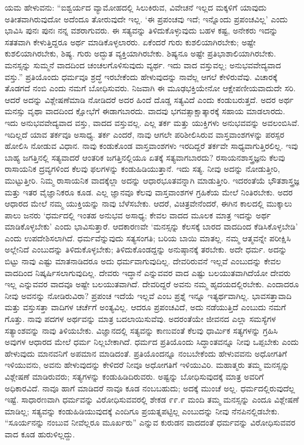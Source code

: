 ಯಮ ಹೇಳುವನು: “ಐಶ್ವರ್ಯದ ವ್ಯಾಮೋಹದಲ್ಲಿ ಸಿಲುಕಿರುವ, ವಿವೇಚನೆ ಇಲ್ಲದ ಮಕ್ಕಳಿಗೆ ಯಾವುದು ಅತೀತವಾಗಿರುವುದೋ ಅದೆಂದೂ ತೋರುವುದೇ ಇಲ್ಲ. ‘ಈ ಪ್ರಪಂಚವು ಇದೆ; ಇನ್ನೊಂದು ಪ್ರಪಂಚವಿಲ್ಲ’ ಎಂದು ಭಾವಿಸಿ ಪುನಃ ಪುನಃ ನನ್ನ ವಶರಾಗುವರು. ಈ ಸತ್ಯವನ್ನು ತಿಳಿದುಕೊಳ್ಳುವುದು ಬಹಳ ಕಷ್ಟ, ಅನೇಕರು ಇದನ್ನು ಸತತವಾಗಿ ಕೇಳುತ್ತಿದ್ದರೂ ಅರ್ಥ ಮಾಡಿಕೊಳ್ಳಲಾರರು. ಏಕೆಂದರೆ ಗುರು ಕುಶಲಿಯಾಗಿರಬೇಕು; ಅಷ್ಟೇ ಕುಶಲಿಯಾಗಿರಬೇಕು, ಶಿಷ್ಯ. ಗುರು ಅದ್ಭುತ ವ್ಯಕ್ತಿಯಾಗಿರಬೇಕು. ಶಿಷ್ಯನೂ ಅಷ್ಟೇ ಪ್ರತಿಭಾಶಾಲಿಯಾಗಿರಬೇಕು. ಮನಸ್ಸನ್ನು ಸುಮ್ಮನೆ ವಾದದಿಂದ ಚಂಚಲಗೊಳಿಸುವುದು ವ್ಯರ್ಥ. ಇದು ವಾದ ವಸ್ತುವಲ್ಲ; ಅನುಭವವೇದ್ಯವಾದ ವಸ್ತು.” ಪ್ರತಿಯೊಂದು ಧರ್ಮವೂ ಶ್ರದ್ಧೆ ಇರಬೇಕೆಂದು ಹೇಳುವುದನ್ನು ನಾವೆಲ್ಲ ಆಗಲೆ ಕೇಳಿರುವೆವು. ವಿಚಾರಕ್ಕೆ ತೊಡಗದೆ ನಂಬಿ ಎಂದು ನಮಗೆ ಬೋಧಿಸುವರು. ನಿಜವಾಗಿ ಈ ಮೂಢಭಕ್ತಿಯೇನೋ ಆಕ್ಷೇಪಣೀಯವಾದುದೇ ಸರಿ. ಆದರೆ ಅದನ್ನು ವಿಶ್ಲೇಷಣೆಮಾಡಿ ನೋಡಿದರೆ ಅದರ ಹಿಂದೆ ದೊಡ್ಡ ಸತ್ಯವಿದೆ ಎಂದು ಕಂಡುಬರುತ್ತದೆ. ಅದರ ಅರ್ಥ ಮನಸ್ಸು ವೃಥಾ ವಾದದಿಂದ ಕ್ಷೋಭೆಗೆ ಈಡಾಗಬಾರದು. ವಾದವು ಭಗವತ್ಸಾಕ್ಷಾತ್ಕಾರಕ್ಕೆ ಸಹಾಯ ಮಾಡಲಾರದು. ಇದು ಅನುಭವವೇದ್ಯವಾದ ವಸ್ತು, ವಾದದ ವಸ್ತುವಲ್ಲ. ಎಲ್ಲ ತರ್ಕ ಮತ್ತು ಯುಕ್ತಿಗಳು ಅನುಭವವನ್ನು ಅವಲಂಬಿಸಿವೆ. ಇದಿಲ್ಲದೆ ಯಾವ ತರ್ಕವೂ ಅಸಾಧ್ಯ. ತರ್ಕ ಎಂದರೆ, ನಾವು ಆಗಲೇ ಪರಿಶೀಲಿಸಿರುವ ವಾಸ್ತವಾಂಶಗಳನ್ನು ಪರಸ್ಪರ ಹೋಲಿಸಿ ನೋಡುವ ವಿಧಾನ. ನಾವು ಕಂಡುಕೊಂಡ ವಾಸ್ತವಾಂಶಗಳು ಇರದಿದ್ದರೆ ತರ್ಕವೇ ಸಾಧ್ಯವಾಗುತ್ತಿರಲಿಲ್ಲ. ಇವು ಬಾಹ್ಯ ಜಗತ್ತಿನಲ್ಲಿ ಸತ್ಯವಾದರೆ ಆಂತರಿಕ ಜಗತ್ತಿನಲ್ಲಿಯೂ ಏತಕ್ಕೆ ಸತ್ಯವಾಗಬಾರದು? ರಸಾಯನಶಾಸ್ತ್ರಜ್ಞನು ಕೆಲವು ರಾಸಾಯನಿಕ ದ್ರವ್ಯಗಳಿಂದ ಕೆಲವು ಫಲಗಳನ್ನು ಕಂಡುಹಿಡಿಯುತ್ತಾನೆ. ಇದು ಸತ್ಯ. ನೀವು ಅದನ್ನು ನೋಡುತ್ತೀರಿ, ಮುಟ್ಟುತ್ತೀರಿ. ನಿಮ್ಮ ರಾಸಾಯನಿಕ ವಾದಕ್ಕೆಲ್ಲಾ ಅದನ್ನು ಆಧಾರಭೂತವನ್ನಾಗಿ ಮಾಡುತ್ತೀರಿ. ಇದರಂತೆಯೆ ಭೌತಶಾಸ್ತ್ರಜ್ಞ ಮತ್ತು ಇತರ ವೈಜ್ಞಾನಿಕರೂ ಕೂಡ. ಎಲ್ಲ ಜ್ಞಾನವೂ ಕೆಲವು ವಾಸ್ತವಾಂಶಗಳ ಗ್ರಹಿಕೆಯ ಮೇಲೆ ನಿಂತಿರಬೇಕು. ಅದರ ಆಧಾರದ ಮೇಲೆ ನಮ್ಮ ಯುಕ್ತಿಯನ್ನು ನಾವು ಬೆಳೆಸಬೇಕು. ಆದರೆ, ವಿಚಿತ್ರವೇನೆಂದರೆ, ಈಗಿನ ಕಾಲದಲ್ಲಿ ಮುಕ್ಕಾಲು ಪಾಲು ಜನರು ‘ಧರ್ಮದಲ್ಲಿ ಇಂತಹ ಅನುಭವ ಅಸಾಧ್ಯ; ಕೇವಲ ವಾದದ ಮೂಲಕ ಮಾತ್ರ ಇದನ್ನು ಅರ್ಥ ಮಾಡಿಕೊಳ್ಳಬೇಕು’ ಎಂದು ಭಾವಿಸುತ್ತಾರೆ. ಆದಕಾರಣವೇ ‘ಮನಸ್ಸನ್ನು ಕೆಲಸಕ್ಕೆ ಬಾರದ ವಾದದಿಂದ ಕೆಡಿಸಿಕೊಳ್ಳಬೇಡಿ’ ಎಂದು ಉಪದೇಶಿಸಲಾಗಿದೆ. ಧರ್ಮವೆನ್ನುವುದು ಸತ್ಯಸಂಗತಿ; ಬರಿಯ ಬಾಯಿ ಮಾತಲ್ಲ. ನಮ್ಮ ಆತ್ಮವನ್ನೇ ಪರೀಕ್ಷಿಸಿ ಅಲ್ಲೇನಿದೆ ಎಂಬುದನ್ನು ತಿಳಿದುಕೊಳ್ಳಬೇಕು; ತಿಳಿದುಕೊಂಡದ್ದನ್ನು ಅನುಷ್ಠಾನಕ್ಕೆ ತರಬೇಕು. ಅದೇ ಧರ್ಮ. ಅದನ್ನು ಬಿಟ್ಟು ನಾವು ಎಷ್ಟು ಮಾತನಾಡಿದರೂ ಅದು ಧರ್ಮವಾಗುವುದಿಲ್ಲ. ದೇವರಿರುವನೆ ಇಲ್ಲವೆ ಎಂಬುದನ್ನು ಕೇವಲ ವಾದದಿಂದ ನಿಷ್ಕರ್ಷಿಸಲಾಗುವುದಿಲ್ಲ. ದೇವರು ಇದ್ಧಾನೆ ಎನ್ನುವವರ ವಾದ ಎಷ್ಟು ಬಲಯುತವಾಗಿದೆಯೋ ದೇವರು ಇಲ್ಲ ಎನ್ನುವವರ ವಾದವೂ ಅಷ್ಟೇ ಬಲಯುತವಾಗಿದೆ. ದೇವರಿದ್ದರೆ ಅವನು ನಮ್ಮ ಹೃದಯದಲ್ಲಿರಬೇಕು. ಎಂದಾದರೂ ನೀವು ಅವನನ್ನು ನೋಡಿರುವಿರಾ? ಪ್ರಪಂಚ ಇದೆಯೆ ಇಲ್ಲವೆ ಎಂಬ ಪ್ರಶ್ನೆ ಇನ್ನೂ ಇತ್ಯರ್ಥವಾಗಿಲ್ಲ. ಭಾವಸತ್ತಾವಾದಿ ಮತ್ತು ವಸ್ತುಸತ್ತಾ ವಾದಿಗಳ ಚರ್ಚೆಗೆ ಅಂತ್ಯವಿಲ್ಲ. ಆದರೂ ಪ್ರಪಂಚವಿದೆ, ಅದು ನಡೆಯುತ್ತಿದೆ ಎಂಬುದು ನಮಗೆ ಗೊತ್ತು. ನಾವು ಪದಗಳ ಅರ್ಥವನ್ನು ಮಾತ್ರ ಬದಲಾಯಿಸುವೆವು. ಅದರಂತೆಯೇ ಜೀವನದ ಎಲ್ಲಾ ಸಮಸ್ಯೆಗಳ ಸತ್ಯಾಂಶವನ್ನು ನಾವು ತಿಳಿಯಬೇಕು. ವಿಜ್ಞಾನದಲ್ಲಿ ಸತ್ಯವನ್ನು ಕಾಣುವಂತೆ ಕೆಲವು ಧಾರ್ಮಿಕ ಸತ್ಯಗಳನ್ನು ಗ್ರಹಿಸಿ ಅವುಗಳ ಆಧಾರದ ಮೇಲೆ ಧರ್ಮ ನಿಲ್ಲಬೇಕಾಗಿದೆ. ಧರ್ಮದ ಪ್ರತಿಯೊಂದು ಸಿದ್ಧಾಂತವನ್ನೂ ನೀವು ಒಪ್ಪಬೇಕು ಎಂದು ಹೇಳುವುದು ಮಾನವನಿಗೆ ಅಪಮಾನ ಮಾಡಿದಂತೆ. ಪ್ರತಿಯೊಂದನ್ನೂ ನಂಬಬೇಕೆಂದು ಹೇಳುವವನು ಅಧೋಗತಿಗೆ ಇಳಿಯುವನು, ಅವನು ಹೇಳುವುದನ್ನು ಕೇಳಿದರೆ ನೀವೂ ಅಧೋಗತಿಗೆ ಇಳಿಯುವಿರಿ. ಮಹಾತ್ಮರು ತಮ್ಮ ಮನಸ್ಸನ್ನು ವಿಶ್ಲೇಷಣೆ ಮಾಡಿರುವರು; ಸತ್ಯಗಳನ್ನು ಕಂಡುಹಿಡಿದಿರುವರು. ಅಷ್ಟನ್ನು ಬೋಧಿಸುವುದಕ್ಕೆ ಮಾತ್ರ ಅವರಿಗೆ ಅಧಿಕಾರವಿದೆ. ನಾವೂ ಹಾಗೆ ಮಾಡಿದರೆ ನಾವೂ ಕೂಡ ನಂಬಬಹುದು; ಅದಕ್ಕೆ ಮುಂಚೆ ಅಲ್ಲ. ಧರ್ಮದಲ್ಲಿರುವುದೆಲ್ಲ ಇಷ್ಟೆ. ಸಾಧಾರಣವಾಗಿ ಧರ್ಮವನ್ನು ವಿರೋಧಿಸುವವರಲ್ಲಿ ಶೇಕಡ ೯೯.೯ ಮಂದಿ ತಮ್ಮ ಮನಸ್ಸನ್ನು ಎಂದೂ ವಿಶ್ಲೇಷಣೆ ಮಾಡಿಲ್ಲ; ಸತ್ಯವನ್ನು ಕಂಡುಹಿಡಿಯುವುದಕ್ಕೆ ಎಂದಿಗೂ ಪ್ರಯತ್ನಪಟ್ಟಿಲ್ಲ ಎಂಬುದನ್ನು ನೀವು ನೆನಪಿನಲ್ಲಿಡಬೇಕು. “ಸೂರ್ಯನನ್ನು ನಂಬುವ ನೀವೆಲ್ಲರೂ ಮೂರ್ಖರು” ಎನ್ನುವ ಕುರುಡನ ವಾದದಂತೆ ಧರ್ಮವನ್ನು ವಿರೋಧಿಸುವವರ ವಾದ ಕೂಡ ಹುರುಳಿಲ್ಲದ್ದು.

